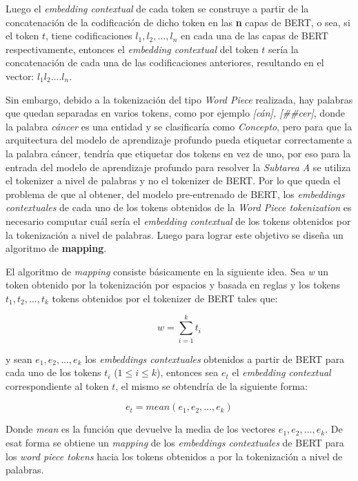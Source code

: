 Luego el \emph{embedding contextual} de cada token se construye a partir de la concatenaci\'on de la codificaci\'on de dicho token en las \textbf{n} capas de BERT, o sea, si el token $t$, tiene codificaciones $l_1, l_2, ..., l_n$ en cada una de las capas de BERT respectivamente, entonces el \emph{embedding contextual} del token $t$ ser\'ia la concatenaci\'on de cada una de las codificaciones anteriores, resultando en el vector: $l_1l_2....l_n$.

Sin embargo, debido a la tokenizaci\'on del tipo \emph{Word Piece} realizada, hay palabras que quedan separadas en varios tokens, como por ejemplo \emph{[c\'an], [\#\#cer]}, donde la palabra \emph{c\'ancer} es una entidad y se clasificar\'ia como \emph{Concepto}, pero para que la arquitectura del modelo de aprendizaje profundo pueda etiquetar correctamente a la palabra c\'ancer, tendr\'ia que etiquetar dos tokens en vez de uno, por eso para la entrada del modelo de aprendizaje profundo para resolver la \emph{Subtarea A} se utiliza el tokenizer a nivel de palabras y no el tokenizer de BERT. Por lo que queda el problema de que al obtener, del modelo pre-entrenado de BERT, los \emph{embeddings contextuales} de cada uno de los tokens obtenidos de la \emph{Word Piece tokenization} es necesario computar cu\'al ser\'ia el \emph{embedding contextual} de los tokens obtenidos por la tokenizaci\'on a nivel de palabras. Luego para lograr este objetivo se dise\~na un algoritmo de \textbf{mapping}. 

El algoritmo de \emph{mapping} consiste b\'asicamente en la siguiente idea. Sea \emph{w} un token obtenido por la tokenizaci\'on por espacios y basada en reglas y los tokens $t_1, t_2, ..., t_k$ tokens obtenidos por el tokenizer de BERT tales que:

\begin{equation}
	w = \sum_{i = 1}^{k} t_i
\end{equation} 


y sean $e_1, e_2, ..., e_k$ los \emph{embeddings contextuales} obtenidos a partir de BERT para cada uno de los tokens $t_i$ ($1 \leq  i \leq k$), entonces sea $e_t$ el  \emph{embedding contextual} correspondiente al token $t$, el mismo se obtendr\'ia de la siguiente forma:

\begin{equation}
	e_t = mean(e_1, e_2, ... , e_k)
\end{equation}

Donde \emph{mean} es la funci\'on que devuelve la media de los vectores $e_1, e_2, ..., e_k$. De esat forma se obtiene un \emph{mapping} de los \emph{embeddings contextuales} de BERT para los \emph{word piece tokens} hacia los tokens obtenidos a por la tokenizaci\'on a nivel de palabras.

